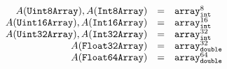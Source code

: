 \documentclass{article}
\newcommand{\mathjssm}[1]{\mbox{\texttt{\scriptsize {#1}}}}
\newcommand{\unsigned}{\mathtt{unsigned}}
\newcommand{\intsm}{\mathjssm{int}}
\newcommand{\doublesm}{\mathjssm{double}}
\newcommand{\signed}{\mathtt{signed}}
\newcommand{\double}{\mathtt{double}}
\newcommand{\arr}[2]{\mathtt{array}^{#1}_{#2}}
\begin{document}
\[
\begin{array}{rcl}
A(\mathtt{Uint8Array}), A(\mathtt{Int8Array})   & = & \arr{8}{\intsm} \\
A(\mathtt{Uint16Array}), A(\mathtt{Int16Array}) & = & \arr{16}{\intsm} \\
A(\mathtt{Uint32Array}), A(\mathtt{Int32Array}) & = & \arr{32}{\intsm} \\
A(\mathtt{Float32Array})                        & = & \arr{32}{\doublesm} \\
A(\mathtt{Float64Array})                        & = & \arr{64}{\doublesm} \\
\end{array}
\]
\end{document}
